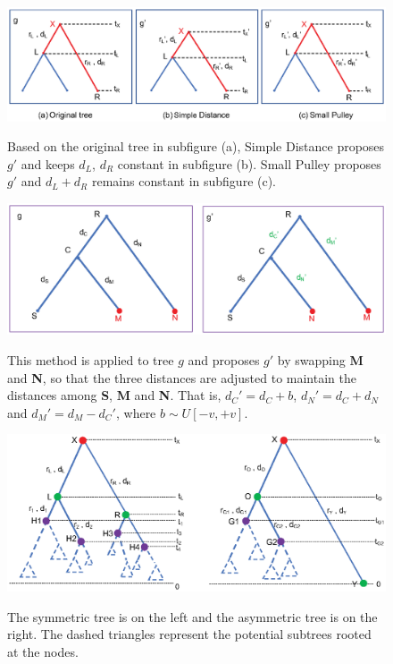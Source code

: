 \documentclass{bmcart}
\begin{document}
\begin{backmatter}
\begin{figure}[h!]
\includegraphics[width=12cm]{Fig03-rootstrategy.eps}\\
\caption{
             Based on the original tree in subfigure (a), Simple Distance proposes ${g}'$ and keeps $d_L$, $d_R$ constant in subfigure (b). Small Pulley proposes ${g}'$ and ${d_L} + {d_R}$ remains constant in subfigure (c).}
\label{simpledistance}
\end{figure}


\begin{figure}[h!]
\includegraphics[width=12cm]{Fig04-exchangemethod.eps}\\
\caption{
             This method is applied to tree $g$ and proposes $g'$ by swapping \textbf{M} and \textbf{N}, so that the three distances are adjusted to maintain the distances among \textbf{S}, \textbf{M} and \textbf{N}. That is, ${d_C}' = {d_C} + b$, ${d_N}' = d_C + d_N$ and ${d_M}' = d_{M} - {d_C}'$, where $b \sim U[ - v, + v]$.}
\label{exchangemethod}
\end{figure}

\begin{figure}[h!]
\includegraphics[width=12cm]{Fig05-treeshape.eps}\\
\caption{
             The symmetric tree is on the left and the asymmetric tree is on the right. The dashed triangles represent the potential subtrees rooted at the nodes.}
\label{treeshape}
\end{figure}


\end{backmatter}
\end{document}
